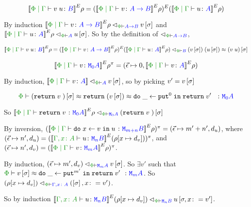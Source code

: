 \documentclass{Report}
\newcommand\eLogRel[4]{\logRel{#2}{\wellformed{#1}{#3}}{#4}}
\newcommand\peLogRel[3]{\eLogRel{\P}{#1}{#2}{#3}}
\newcommand{\zpberelation}[2]{\berelation{\P}{#1}{#2}}
\newcommand{\fapply}[0]{^E}
\newcommand\liftp[0]{^\pi}
\begin{document}
\case{\vapply}
\begin{equation}
    \deno{\gpetyperelation{\apply{v}{u}}{B}}\fapply\rho = (\deno{\gpetyperelation{v}{\ab}}\fapply\rho)\fapply(\deno{\gpetyperelation{u}{A}}\fapply\rho)
\end{equation}

By induction $\peLogRel{\deno{\gpetyperelation{v}{\ab}}\fapply\rho}{\ab}{v\ssi}$ and $\peLogRel{\deno{\gpetyperelation{u}{A}}\fapply\rho}{A}{u\ssi}$. So by the definition of $\relates_{\wellformed{\P}{\ab}}$, 

\begin{align*}
    \deno{\gpetyperelation{\apply{v}{u}}{B}}\fapply\rho =\peLogRel{(\deno{\gpetyperelation{v}{\ab}}\fapply\rho)\fapply(\deno{\gpetyperelation{u}{A}}\fapply\rho)}{B}{\apply{(v\ssi)}{(u\ssi)}\beequiv (\apply{v}{u})\ssi}
\end{align*}

\case{\vreturn}

\begin{equation}
    \deno{\gpetyperelation{v}{\M{0}{A}}}\fapply\rho\liftp = (\ev\mapsto 0, \deno{\gpetyperelation{v}{A}}\fapply\rho)
\end{equation}

By induction, $\peLogRel{\deno{\gpetyperelation{v}{A}}}{A}{v\ssi}$, so by picking $v' = v\left[\sigma\right]$

\begin{equation}
    \zpberelation{(\return{v})\ssi}{\return{(v\ssi)\beequiv \doin{\_}{\put^0}{\return{v'}}}}{\M{0}{A}}
\end{equation}

So $\peLogRel{\deno{\gpetyperelation{\return{v}}{\M{0}{A}}}\fapply\rho}{\M{0}{A}}{(\return{v})\ssi}$

\case{\vbind}

By inversion, $(\deno{\gpetyperelation{\doin{x}{v}{u}}{\M{m+n}{B}}}\fapply\rho)\liftp = (\ev\mapsto m'+n', d_u)$, where $(\ev\mapsto n', d_u) = (\deno{\typerelation{\gax}{u}{\mnb}}\fapply(\rho[x\mapsto d_v]))\liftp$, and $(\ev\mapsto n', d_v) = (\deno{\gpetyperelation{v}{\mma}}\fapply\rho)\liftp$.

By induction, $\peLogRel{(\ev\mapsto m', d_v)}{\mma}{v\ssi}$. So $\exists v'$ such that $\zpberelation{v\ssi}{\doin{\_}{\put^{m'}}{\return{v'}}}{\mma}$. So $\peLogRel{(\rho[x\mapsto d_v])}{\gax}{(\ssi, x\setto v')}$.

So by induction $\peLogRel{\deno{\typerelation{\gax}{u}{\mnb}}\fapply(\rho[x\mapsto d_v])}{\mnb}{u\sub{\si, x\setto v'}}$.
\end{document}
